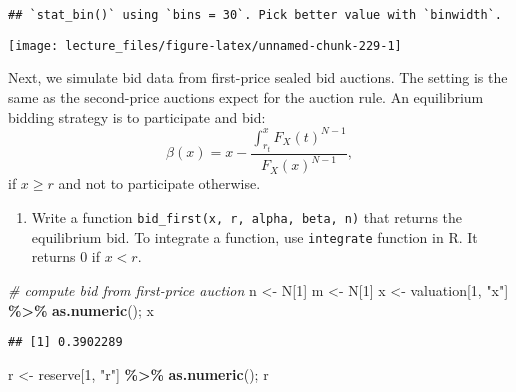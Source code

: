 \documentclass[
]{book}
\newenvironment{Shaded}{\begin{snugshade}}{\end{snugshade}}
\newcommand{\CommentTok}[1]{\textcolor[rgb]{0.56,0.35,0.01}{\textit{#1}}}
\newcommand{\DecValTok}[1]{\textcolor[rgb]{0.00,0.00,0.81}{#1}}
\newcommand{\FunctionTok}[1]{\textcolor[rgb]{0.13,0.29,0.53}{\textbf{#1}}}
\newcommand{\NormalTok}[1]{#1}
\newcommand{\OtherTok}[1]{\textcolor[rgb]{0.56,0.35,0.01}{#1}}
\newcommand{\SpecialCharTok}[1]{\textcolor[rgb]{0.81,0.36,0.00}{\textbf{#1}}}
\newcommand{\StringTok}[1]{\textcolor[rgb]{0.31,0.60,0.02}{#1}}
\providecommand{\tightlist}{%
  \setlength{\itemsep}{0pt}\setlength{\parskip}{0pt}}
\begin{document}
\begin{verbatim}
## `stat_bin()` using `bins = 30`. Pick better value with `binwidth`.
\end{verbatim}

\begin{center}\texttt{[image: lecture\_files/figure-latex/unnamed-chunk-229-1]} \end{center}

Next, we simulate bid data from first-price sealed bid auctions. The setting is the same as the second-price auctions expect for the auction rule. An equilibrium bidding strategy is to participate and bid:
\[
\beta(x) = x - \frac{\int_{r_t}^x F_X(t)^{N - 1}}{F_X(x)^{N - 1}},
\]
if \(x \ge r\) and not to participate otherwise.

\begin{enumerate}
\def\labelenumi{\arabic{enumi}.}
\setcounter{enumi}{3}
\tightlist
\item
  Write a function \texttt{bid\_first(x,\ r,\ alpha,\ beta,\ n)} that returns the equilibrium bid. To integrate a function, use \texttt{integrate} function in R. It returns 0 if \(x < r\).
\end{enumerate}

\begin{Shaded}
\begin{Highlighting}[]
\CommentTok{\# compute bid from first{-}price auction}
\NormalTok{n }\OtherTok{\textless{}{-}}\NormalTok{ N[}\DecValTok{1}\NormalTok{]}
\NormalTok{m }\OtherTok{\textless{}{-}}\NormalTok{ N[}\DecValTok{1}\NormalTok{]}
\NormalTok{x }\OtherTok{\textless{}{-}}\NormalTok{ valuation[}\DecValTok{1}\NormalTok{, }\StringTok{"x"}\NormalTok{] }\SpecialCharTok{\%\textgreater{}\%} 
  \FunctionTok{as.numeric}\NormalTok{();}
\NormalTok{x}
\end{Highlighting}
\end{Shaded}

\begin{verbatim}
## [1] 0.3902289
\end{verbatim}

\begin{Shaded}
\begin{Highlighting}[]
\NormalTok{r }\OtherTok{\textless{}{-}} 
\NormalTok{  reserve[}\DecValTok{1}\NormalTok{, }\StringTok{"r"}\NormalTok{] }\SpecialCharTok{\%\textgreater{}\%} 
  \FunctionTok{as.numeric}\NormalTok{(); }
\NormalTok{r}
\end{Highlighting}
\end{Shaded}
\end{document}
